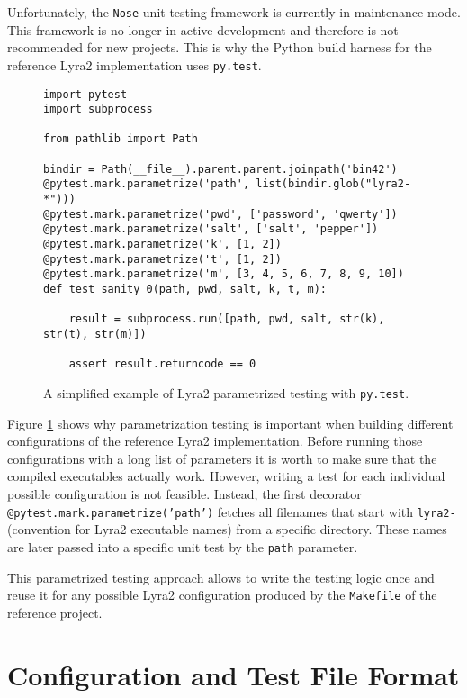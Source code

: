 Unfortunately, the \texttt{Nose} unit testing framework is currently in maintenance mode. This framework is no longer in active development and therefore is not recommended for new projects. This is why the Python build harness for the reference Lyra2 implementation uses \texttt{py.test}.

\begin{figure}
\begin{verbatim}
import pytest
import subprocess

from pathlib import Path

bindir = Path(__file__).parent.parent.joinpath('bin42')
@pytest.mark.parametrize('path', list(bindir.glob("lyra2-*")))
@pytest.mark.parametrize('pwd', ['password', 'qwerty'])
@pytest.mark.parametrize('salt', ['salt', 'pepper'])
@pytest.mark.parametrize('k', [1, 2])
@pytest.mark.parametrize('t', [1, 2])
@pytest.mark.parametrize('m', [3, 4, 5, 6, 7, 8, 9, 10])
def test_sanity_0(path, pwd, salt, k, t, m):

    result = subprocess.run([path, pwd, salt, str(k), str(t), str(m)])

    assert result.returncode == 0
\end{verbatim}
\caption{A simplified example of Lyra2 parametrized testing with \texttt{py.test}.}
\label{fig:pytest-parametrization}
\end{figure}

Figure \ref{fig:pytest-parametrization} shows why parametrization testing is important when building different configurations of the reference Lyra2 implementation. Before running those configurations with a long list of parameters it is worth to make sure that the compiled executables actually work. However, writing a test for each individual possible configuration is not feasible. Instead, the first decorator \texttt{@pytest.mark.parametrize('path')} fetches all filenames that start with \texttt{lyra2-} (convention for Lyra2 executable names) from a specific directory. These names are later passed into a specific unit test by the \texttt{path} parameter.

This parametrized testing approach allows to write the testing logic once and reuse it for any possible Lyra2 configuration produced by the \texttt{Makefile} of the reference project.

\section{Configuration and Test File Format}
\label{sec:configuration-and-test-file-format}

